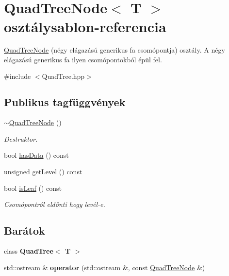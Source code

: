 \hypertarget{class_quad_tree_node}{\section{Quad\-Tree\-Node$<$ T $>$ osztálysablon-\/referencia}
\label{class_quad_tree_node}
}


\hyperlink{class_quad_tree_node}{Quad\-Tree\-Node} (négy elágazású generikus fa csomópontja) osztály. A négy elágazású generikus fa ilyen csomópontokból épül fel.  




{\ttfamily \#include $<$Quad\-Tree.\-hpp$>$}

\subsection*{Publikus tagfüggvények}
\begin{DoxyCompactItemize}
\item 
\hypertarget{class_quad_tree_node_a4db3bc80d18715b6eabf388a864b7007}{\hyperlink{class_quad_tree_node_a4db3bc80d18715b6eabf388a864b7007}{$\sim$\-Quad\-Tree\-Node} ()}\label{class_quad_tree_node_a4db3bc80d18715b6eabf388a864b7007}

\begin{DoxyCompactList}\small\item\em Destruktor. \end{DoxyCompactList}\item 
bool \hyperlink{class_quad_tree_node_a8b141eb49215f569ab3735cfd9f43d6e}{has\-Data} () const 
\item 
unsigned \hyperlink{class_quad_tree_node_a8b7e28da3aa5403e367b3c4ed094ba00}{get\-Level} () const 
\item 
bool \hyperlink{class_quad_tree_node_a9c6c010af46e16c4c2829b867055528b}{is\-Leaf} () const 
\begin{DoxyCompactList}\small\item\em Csomópontról eldönti hogy levél-\/e. \end{DoxyCompactList}\end{DoxyCompactItemize}
\subsection*{Barátok}
\begin{DoxyCompactItemize}
\item 
\hypertarget{class_quad_tree_node_a86cf92e1bfbee775eead8ccd7dbdc1f8}{class {\bfseries Quad\-Tree$<$ T $>$}}\label{class_quad_tree_node_a86cf92e1bfbee775eead8ccd7dbdc1f8}

\item 
\hypertarget{class_quad_tree_node_ac25992d68676ddc77fb4702cc5f37338}{std\-::ostream \& {\bfseries operator} (std\-::ostream \&, const \hyperlink{class_quad_tree_node}{Quad\-Tree\-Node} \&)}\label{class_quad_tree_node_ac25992d68676ddc77fb4702cc5f37338}

\end{DoxyCompactItemize}


